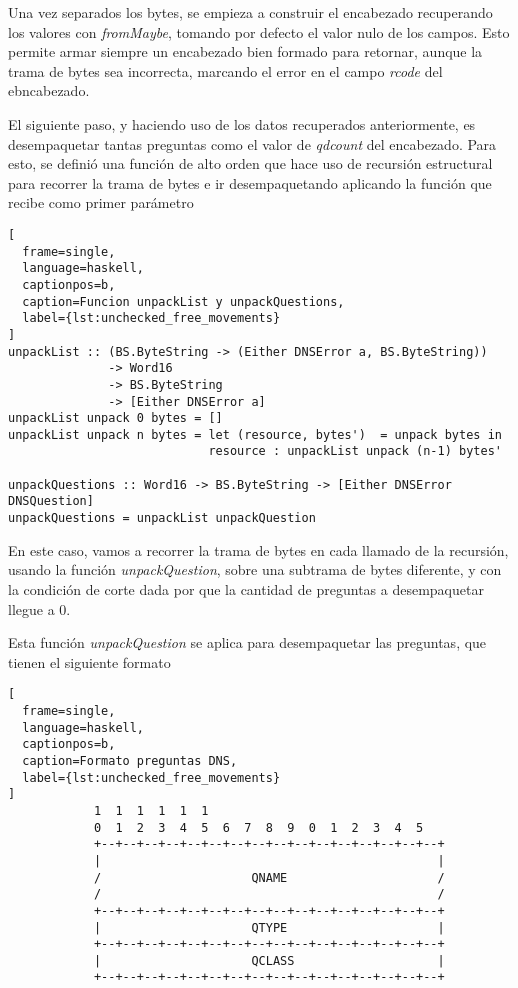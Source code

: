 \documentclass[6pt]{article}
\begin{document}
Una vez separados los bytes, se empieza a construir el encabezado
recuperando los valores con \textit{fromMaybe}, tomando por defecto
el valor nulo de los campos. Esto permite armar siempre un encabezado
bien formado para retornar, aunque la trama de bytes sea incorrecta,
marcando el error en el campo \textit{rcode} del ebncabezado.

El siguiente paso, y haciendo uso de los datos recuperados
anteriormente, es desempaquetar tantas preguntas como el
valor de \textit{qdcount} del encabezado. Para esto, se
definió una función de alto orden que hace uso de
recursión estructural para recorrer la trama de bytes e
ir desempaquetando aplicando la función que recibe como
primer parámetro

\begin{lstlisting}[
  frame=single,
  language=haskell,
  captionpos=b,
  caption=Funcion unpackList y unpackQuestions,
  label={lst:unchecked_free_movements}
]
unpackList :: (BS.ByteString -> (Either DNSError a, BS.ByteString))
              -> Word16
              -> BS.ByteString
              -> [Either DNSError a]
unpackList unpack 0 bytes = []
unpackList unpack n bytes = let (resource, bytes')  = unpack bytes in
                            resource : unpackList unpack (n-1) bytes'

unpackQuestions :: Word16 -> BS.ByteString -> [Either DNSError DNSQuestion]
unpackQuestions = unpackList unpackQuestion
\end{lstlisting}

En este caso, vamos a recorrer la trama de bytes en cada llamado
de la recursión, usando la función \textit{unpackQuestion}, sobre una
subtrama de bytes diferente, y con la condición de corte
dada por que la cantidad de preguntas a desempaquetar llegue a 0.

Esta función \textit{unpackQuestion} se aplica para desempaquetar
las preguntas, que tienen el siguiente formato

\begin{lstlisting}[
  frame=single,
  language=haskell,
  captionpos=b,
  caption=Formato preguntas DNS,
  label={lst:unchecked_free_movements}
]
            1  1  1  1  1  1
            0  1  2  3  4  5  6  7  8  9  0  1  2  3  4  5
            +--+--+--+--+--+--+--+--+--+--+--+--+--+--+--+--+
            |                                               |
            /                     QNAME                     /
            /                                               /
            +--+--+--+--+--+--+--+--+--+--+--+--+--+--+--+--+
            |                     QTYPE                     |
            +--+--+--+--+--+--+--+--+--+--+--+--+--+--+--+--+
            |                     QCLASS                    |
            +--+--+--+--+--+--+--+--+--+--+--+--+--+--+--+--+
\end{lstlisting}
\end{document}
